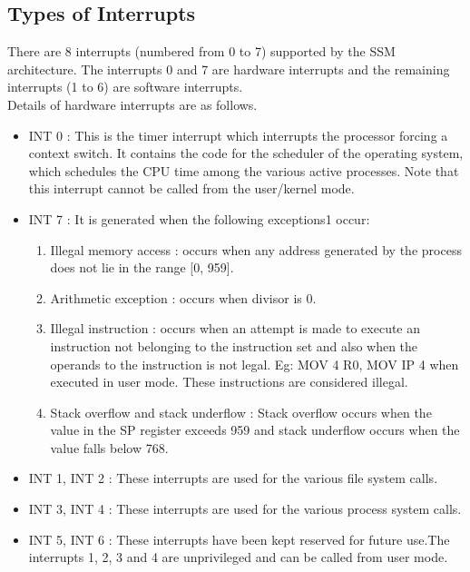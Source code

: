 \documentclass[11pt]{article}
\begin{document}
\subsection{Types of Interrupts}
There are 8 interrupts (numbered from 0 to 7) supported by the SSM architecture. The interrupts 0 and 7 are hardware interrupts and the remaining interrupts (1 to 6) are software interrupts.\\
Details of hardware interrupts are as follows.
\begin{itemize}
\item INT 0 : This is the timer interrupt which interrupts the processor forcing a context switch. It contains the code for the scheduler of the operating system, which schedules the CPU time among the various active processes. Note that this interrupt cannot be called from the user/kernel mode.
\item INT 7 : It is generated when the following exceptions1 occur:
\begin{enumerate}


\item Illegal memory access : occurs when any address generated by the process does not lie in the range [0, 959].
\item Arithmetic exception : occurs when divisor is 0.
\item Illegal instruction : occurs when an attempt is made to execute an instruction not belonging to the instruction set and also when the operands to the instruction is not legal. Eg: MOV 4 R0, MOV IP 4 when executed in user mode. These instructions are considered illegal.
\item Stack overflow and stack underflow : Stack overflow occurs when the value in the SP register exceeds 959 and stack underflow occurs when the value falls below 768.
\end{enumerate}
\item INT 1, INT 2 : These interrupts are used for the various file system calls. 
\item INT 3, INT 4 : These interrupts are used for the various process system calls. 
\item INT 5, INT 6 : These interrupts have been kept reserved for future use.The interrupts 1, 2, 3 and 4 are unprivileged and can be called from user mode.
\end{itemize}
\end{document}
